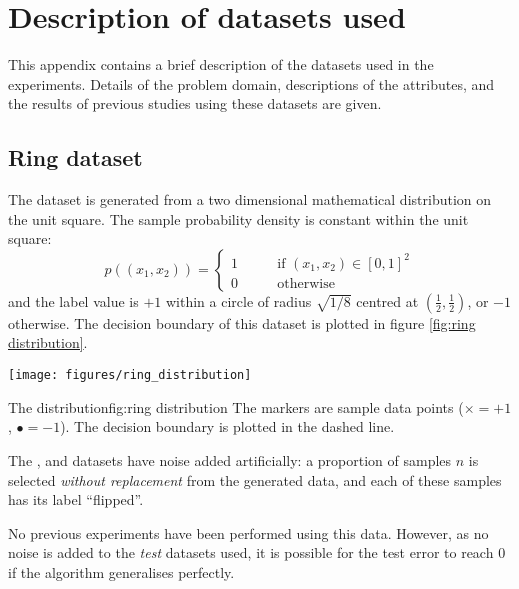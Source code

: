 
\chapter{Description of datasets used}
\label{appendix:datasets}

This appendix contains a brief description of the datasets used in the
experiments.  Details of the problem domain, descriptions of the
attributes, and the results of previous studies using these datasets
are given.

\section{Ring dataset}

The  dataset is generated from a two dimensional mathematical
distribution on the unit square.  The sample probability density is
constant within the unit square:
%
\begin{equation}
p((x_1, x_2)) = \left\{ \begin{array}{rr}
1	& \qquad \mbox{if $(x_1, x_2) \in [0,1]^2$} \\
0	& \qquad \mbox{otherwise}
\end{array} \right.
\end{equation}
%
and the label value is $+1$ within a circle of radius $\sqrt{1/8}$
centred at $(\frac{1}{2},\frac{1}{2})$, or $-1$ otherwise.  The
decision boundary of this dataset is plotted in figure \ref{fig:ring
distribution}.

\begin{linefigure}
\begin{center}
\texttt{[image: figures/ring\_distribution]}
\end{center}
\begin{capt}{The  distribution}{fig:ring distribution}
The markers are sample data points ($\times=+1$, $\bullet=-1$).  The
decision boundary is plotted in the dashed line.
\end{capt}
\end{linefigure}

The ,  and  datasets have noise added
artificially: a proportion of samples $n$ is selected \emph{without
replacement} from the generated data, and each of these samples has
its label ``flipped''.

No previous experiments have been performed using this data.  However,
as no noise is added to the \emph{test} datasets used, it is possible
for the test error to reach 0 if the algorithm generalises perfectly.

